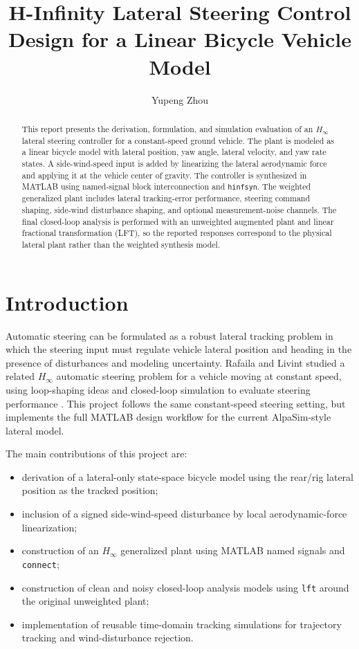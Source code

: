 \documentclass[10pt,twocolumn]{article}
\title{\vspace{-0.4in}H-Infinity Lateral Steering Control Design for a Linear Bicycle Vehicle Model}
\author{Yupeng Zhou}
\date{}
\begin{document}
\maketitle

\begin{abstract}
This report presents the derivation, formulation, and simulation evaluation of an
$H_\infty$ lateral steering controller for a constant-speed ground vehicle. The
plant is modeled as a linear bicycle model with lateral position, yaw angle,
lateral velocity, and yaw rate states. A side-wind-speed input is added by
linearizing the lateral aerodynamic force and applying it at the vehicle center
of gravity. The controller is synthesized in MATLAB using named-signal block
interconnection and \texttt{hinfsyn}. The weighted generalized plant includes
lateral tracking-error performance, steering command shaping, side-wind
disturbance shaping, and optional measurement-noise channels. The final
closed-loop analysis is performed with an unweighted augmented plant and
linear fractional transformation (LFT), so the reported responses correspond to
the physical lateral plant rather than the weighted synthesis model.
\end{abstract}

\section{Introduction}

Automatic steering can be formulated as a robust lateral tracking problem in
which the steering input must regulate vehicle lateral position and heading in
the presence of disturbances and modeling uncertainty. Rafaila and Livint
studied a related $H_\infty$ automatic steering problem for a vehicle moving at
constant speed, using loop-shaping ideas and closed-loop simulation to evaluate
steering performance \cite{rafaila2016}. This project follows the same
constant-speed steering setting, but implements the full MATLAB design workflow
for the current AlpaSim-style lateral model.

The main contributions of this project are:
\begin{itemize}
    \item derivation of a lateral-only state-space bicycle model using the
    rear/rig lateral position as the tracked position;
    \item inclusion of a signed side-wind-speed disturbance by local
    aerodynamic-force linearization;
    \item construction of an $H_\infty$ generalized plant using MATLAB named
    signals and \texttt{connect};
    \item construction of clean and noisy closed-loop analysis models using
    \texttt{lft} around the original unweighted plant;
    \item implementation of reusable time-domain tracking simulations for
    trajectory tracking and wind-disturbance rejection.
\end{itemize}
\end{document}
